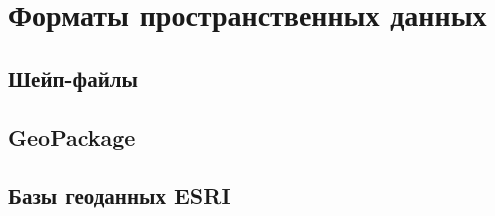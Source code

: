\documentclass[
  12pt,
]{book}
\begin{document}
\hypertarget{appendix-ux441ux43fux440ux430ux432ux43eux447ux43dux44bux435-ux441ux432ux435ux434ux435ux43dux438ux44f}{%
\appendix}


\hypertarget{manual-catalog}{%
\chapter{Форматы пространственных данных}\label{manual-catalog}}

\hypertarget{ux448ux435ux439ux43f-ux444ux430ux439ux43bux44b}{%
\section{Шейп-файлы}\label{ux448ux435ux439ux43f-ux444ux430ux439ux43bux44b}}

\hypertarget{geopackage}{%
\section{GeoPackage}\label{geopackage}}

\hypertarget{ux431ux430ux437ux44b-ux433ux435ux43eux434ux430ux43dux43dux44bux445-esri}{%
\section{Базы геоданных ESRI}\label{ux431ux430ux437ux44b-ux433ux435ux43eux434ux430ux43dux43dux44bux445-esri}}

  
\end{document}
